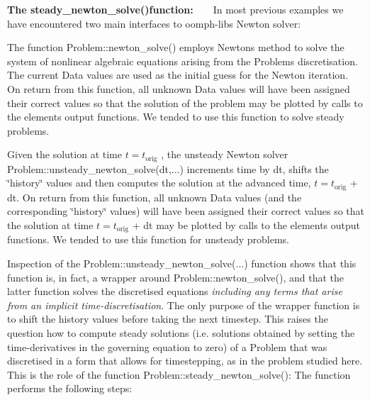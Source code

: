 \begin{DoxyItemize}
\item {\bfseries The {\ttfamily steady\+\_\+newton\+\_\+solve()}function\+:} ~\newline
~\newline
 In most previous examples we have encountered two main interfaces to {\ttfamily oomph-\/lib\textquotesingle{}s} Newton solver\+: ~\newline
~\newline

\begin{DoxyItemize}
\item The function {\ttfamily Problem\+::newton\+\_\+solve()} employs Newton\textquotesingle{}s method to solve the system of nonlinear algebraic equations arising from the {\ttfamily Problem\textquotesingle{}s} discretisation. The current {\ttfamily Data} values are used as the initial guess for the Newton iteration. On return from this function, all unknown {\ttfamily Data} values will have been assigned their correct values so that the solution of the problem may be plotted by calls to the elements\textquotesingle{} {\ttfamily output} functions. We tended to use this function to solve steady problems. ~\newline
~\newline

\item Given the solution at time $ t = t_{\mbox{orig}} $ , the unsteady Newton solver {\ttfamily  Problem\+::unsteady\+\_\+newton\+\_\+solve(dt,...) } increments time by {\ttfamily dt}, shifts the \char`\"{}history\char`\"{} values and then computes the solution at the advanced time, $ t = t_{\mbox{orig}} $ + {\ttfamily dt}. On return from this function, all unknown {\ttfamily Data} values (and the corresponding \char`\"{}history\char`\"{} values) will have been assigned their correct values so that the solution at time $ t = t_{\mbox{orig}} $ + {\ttfamily dt} may be plotted by calls to the elements\textquotesingle{} {\ttfamily output} functions. We tended to use this function for unsteady problems. ~\newline
~\newline

\end{DoxyItemize}Inspection of the {\ttfamily Problem\+::unsteady\+\_\+newton\+\_\+solve}(...) function shows that this function is, in fact, a wrapper around {\ttfamily Problem\+::newton\+\_\+solve()}, and that the latter function solves the discretised equations {\itshape including any terms that arise from an implicit time-\/discretisation}. The only purpose of the wrapper function is to shift the history values before taking the next timestep. This raises the question how to compute steady solutions (i.\+e. solutions obtained by setting the time-\/derivatives in the governing equation to zero) of a {\ttfamily Problem} that was discretised in a form that allows for timestepping, as in the problem studied here. This is the role of the function {\ttfamily Problem\+::steady\+\_\+newton\+\_\+solve()}\+: The function performs the following steps\+: ~\newline
~\newline


\end{DoxyItemize}
